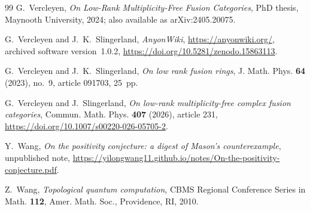\documentclass{amsart}
\begin{document}
\begin{thebibliography}{99}
 {\sc G.~Vercleyen}, \emph{On Low-Rank Multiplicity-Free Fusion Categories}, PhD thesis, Maynooth University, 2024; also available as arXiv:2405.20075.

{\sc G.~Vercleyen and J.~K.~Slingerland},
{\em AnyonWiki}, \url{https://anyonwiki.org/},
archived software version~1.0.2,
\url{https://doi.org/10.5281/zenodo.15863113}.

{\sc G.~Vercleyen and J.~K.~Slingerland},
{\em On low rank fusion rings}, J. Math. Phys. \textbf{64} (2023),
no.~9, article 091703, 25~pp.

{\sc G.~Vercleyen and J.~Slingerland},
{\em On low-rank multiplicity-free complex fusion categories},
Commun. Math. Phys. \textbf{407} (2026), article 231,
\url{https://doi.org/10.1007/s00220-026-05705-2}.

{\sc Y.~Wang},
{\em On the positivity conjecture: a digest of Mason's counterexample},
unpublished note, \url{https://yilongwang11.github.io/notes/On-the-positivity-conjecture.pdf}.

{\sc Z.~Wang},
{\em Topological quantum computation},
CBMS Regional Conference Series in Math. \textbf{112},
Amer. Math. Soc., Providence, RI, 2010.

\enlargethispage{24pt}
\end{thebibliography}
\end{document}
